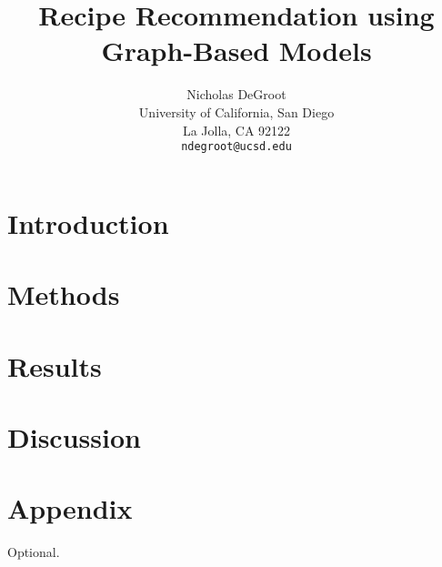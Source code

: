 \documentclass{article}
\title{Recipe Recommendation using Graph-Based Models}
\author{%
  Nicholas DeGroot \\
  University of California, San Diego \\
  La Jolla, CA 92122 \\
  \texttt{ndegroot@ucsd.edu}
}
\begin{document}
\maketitle


\begin{abstract}
      \answerTODO
\end{abstract}


\section{Introduction}

\answerTODO

\section{Methods}

\answerTODO

\section{Results}

\answerTODO

\section{Discussion}

\answerTODO




\appendix


\section{Appendix}


Optional.
\end{document}
